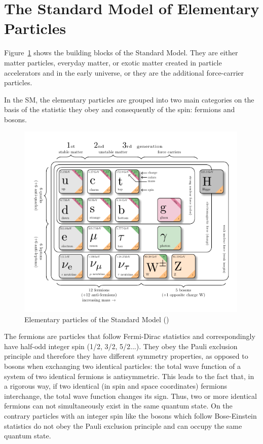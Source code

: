 \section{The Standard Model of Elementary Particles}\label{sec:sm}
Figure~\ref{fig:SMfig} shows the building blocks of the Standard Model. They are either matter particles, everyday matter, or exotic matter created in particle accelerators and in the early universe, or they are the additional force-carrier particles.

In the SM, the elementary particles are grouped into two main categories on the basis of the statistic they obey and consequently of the spin: fermions and bosons. 
\begin{figure}[h]
\centering
\includegraphics[width=0.99\textwidth]{Figures/c1/SM_infographic.pdf}
\caption{Elementary particles of the Standard Model (\willem)}
\label{fig:SMfig}
\end{figure}

The fermions are particles that follow Fermi-Dirac statistics and correspondingly have half-odd integer spin (1/2, 3/2, 5/2...). They obey the Pauli exclusion principle and therefore they have different symmetry properties, as opposed to bosons when exchanging two identical particles: the total wave function of a system of two identical fermions is antisymmetric. This leads to the fact that, in a rigorous way, if two identical (in spin and space coordinates) fermions interchange, the total wave function changes its sign. Thus, two or more identical fermions can not simultaneously exist in the same quantum state. On the contrary particles with an integer spin like the bosons which follow Bose-Einstein statistics do not obey the Pauli exclusion principle and can occupy the same quantum state. 


